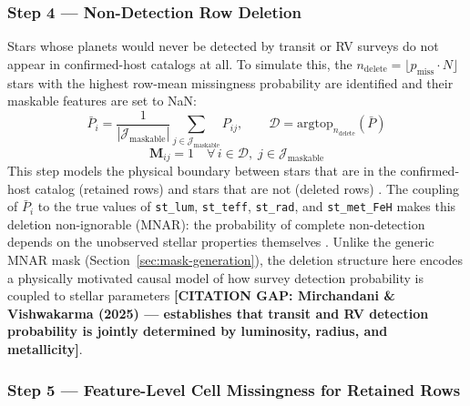 \documentclass[preprint]{aastex631}
\begin{document}
\subsubsection*{Step 4 --- Non-Detection Row Deletion}

Stars whose planets would never be detected by transit or RV surveys do not appear in confirmed-host catalogs at all. To simulate this, the $n_{\mathrm{delete}} = \lfloor p_{\mathrm{miss}} \cdot N \rfloor$ stars with the highest row-mean missingness probability are identified and their maskable features are set to NaN:
\begin{equation}
  \bar{P}_i = \frac{1}{|\mathcal{J}_{\mathrm{maskable}}|} \sum_{j \in \mathcal{J}_{\mathrm{maskable}}} P_{ij},
  \qquad \mathcal{D} = \mathrm{argtop}_{n_{\mathrm{delete}}}(\bar{P})
  \label{eq:row-deletion}
\end{equation}
\begin{equation}
  \mathbf{M}_{ij} = 1 \quad \forall\, i \in \mathcal{D},\; j \in \mathcal{J}_{\mathrm{maskable}}
  \label{eq:deletion-mask}
\end{equation}
This step models the physical boundary between stars that are in the confirmed-host catalog (retained rows) and stars that are not (deleted rows) \citep{gaidosOBJECTSKEPLERSMIRROR2012,burkeTERRESTRIALPLANETOCCURRENCE2015}. The coupling of $\bar{P}_i$ to the true values of \texttt{st\_lum}, \texttt{st\_teff}, \texttt{st\_rad}, and \texttt{st\_met\_FeH} makes this deletion non-ignorable (MNAR): the probability of complete non-detection depends on the unobserved stellar properties themselves \citep{hsuOccurrenceRatesPlanets2019}. Unlike the generic MNAR mask (Section~\ref{sec:mask-generation}), the deletion structure here encodes a physically motivated causal model of how survey detection probability is coupled to stellar parameters \textbf{[CITATION GAP: Mirchandani \& Vishwakarma (2025) --- establishes that transit and RV detection probability is jointly determined by luminosity, radius, and metallicity]}.

\subsubsection*{Step 5 --- Feature-Level Cell Missingness for Retained Rows}
\end{document}
